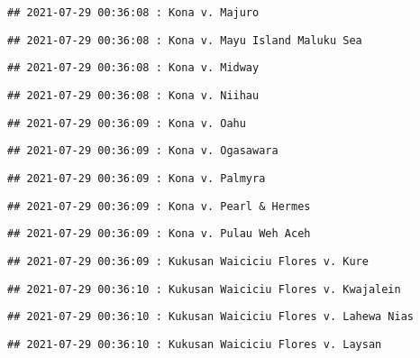 \documentclass[
]{article}
\begin{document}
\begin{verbatim}
## 2021-07-29 00:36:08 : Kona v. Majuro
\end{verbatim}

\begin{verbatim}
## 2021-07-29 00:36:08 : Kona v. Mayu Island Maluku Sea
\end{verbatim}

\begin{verbatim}
## 2021-07-29 00:36:08 : Kona v. Midway
\end{verbatim}

\begin{verbatim}
## 2021-07-29 00:36:08 : Kona v. Niihau
\end{verbatim}

\begin{verbatim}
## 2021-07-29 00:36:09 : Kona v. Oahu
\end{verbatim}

\begin{verbatim}
## 2021-07-29 00:36:09 : Kona v. Ogasawara
\end{verbatim}

\begin{verbatim}
## 2021-07-29 00:36:09 : Kona v. Palmyra
\end{verbatim}

\begin{verbatim}
## 2021-07-29 00:36:09 : Kona v. Pearl & Hermes
\end{verbatim}

\begin{verbatim}
## 2021-07-29 00:36:09 : Kona v. Pulau Weh Aceh
\end{verbatim}

\begin{verbatim}
## 2021-07-29 00:36:09 : Kukusan Waiciciu Flores v. Kure
\end{verbatim}

\begin{verbatim}
## 2021-07-29 00:36:10 : Kukusan Waiciciu Flores v. Kwajalein
\end{verbatim}

\begin{verbatim}
## 2021-07-29 00:36:10 : Kukusan Waiciciu Flores v. Lahewa Nias
\end{verbatim}

\begin{verbatim}
## 2021-07-29 00:36:10 : Kukusan Waiciciu Flores v. Laysan
\end{verbatim}
\end{document}
